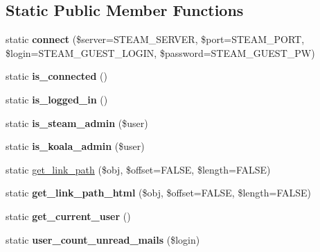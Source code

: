 \subsection*{Static Public Member Functions}
\begin{DoxyCompactItemize}
\item 
\hypertarget{classlms__steam_aceefd069caa7542a96e067d80589a99b}{
static {\bfseries connect} (\$server=STEAM\_\-SERVER, \$port=STEAM\_\-PORT, \$login=STEAM\_\-GUEST\_\-LOGIN, \$password=STEAM\_\-GUEST\_\-PW)}
\label{classlms__steam_aceefd069caa7542a96e067d80589a99b}

\item 
\hypertarget{classlms__steam_a51fee5857b697d1e91a4a9c5b4bc1ca1}{
static {\bfseries is\_\-connected} ()}
\label{classlms__steam_a51fee5857b697d1e91a4a9c5b4bc1ca1}

\item 
\hypertarget{classlms__steam_a5ebba225efb5595425488a844efbe11e}{
static {\bfseries is\_\-logged\_\-in} ()}
\label{classlms__steam_a5ebba225efb5595425488a844efbe11e}

\item 
\hypertarget{classlms__steam_ad5118e759a62144c3c3143214abea7f0}{
static {\bfseries is\_\-steam\_\-admin} (\$user)}
\label{classlms__steam_ad5118e759a62144c3c3143214abea7f0}

\item 
\hypertarget{classlms__steam_aa848b92906dd5b4ba54ae197c0497338}{
static {\bfseries is\_\-koala\_\-admin} (\$user)}
\label{classlms__steam_aa848b92906dd5b4ba54ae197c0497338}

\item 
static \hyperlink{classlms__steam_a9bf61c9db0432d45b15fab83133e828b}{get\_\-link\_\-path} (\$obj, \$offset=FALSE, \$length=FALSE)
\item 
\hypertarget{classlms__steam_a3e83edd8c50c5513efc57497829e804b}{
static {\bfseries get\_\-link\_\-path\_\-html} (\$obj, \$offset=FALSE, \$length=FALSE)}
\label{classlms__steam_a3e83edd8c50c5513efc57497829e804b}

\item 
\hypertarget{classlms__steam_a95e9c04f7dce190a3c1e7b97b4c03660}{
static {\bfseries get\_\-current\_\-user} ()}
\label{classlms__steam_a95e9c04f7dce190a3c1e7b97b4c03660}

\item 
\hypertarget{classlms__steam_ad269ef7efca132c4a0978db8d1e989ff}{
static {\bfseries user\_\-count\_\-unread\_\-mails} (\$login)}
\label{classlms__steam_ad269ef7efca132c4a0978db8d1e989ff}


\end{DoxyCompactItemize}
